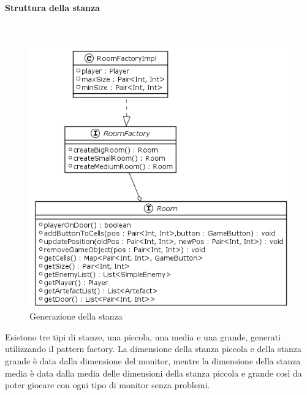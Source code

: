 \documentclass[a4paper,titlepage,12pt]{article}
\begin{document}
\paragraph{Struttura della stanza}
\par \noindent \\
\begin{figure}[H]
    \centering
    \includegraphics[scale=0.7]{img/uml/Room.png}
    \caption{Generazione della stanza}
    \label{fig: Stanza}
\end{figure}
\par \noindent Esistono tre tipi di stanze, una piccola, una media e una grande, generati utilizzando il pattern factory. La dimensione della stanza piccola e della stanza grande è data dalla dimensione del monitor, mentre la dimensione della stanza media è data dalla media delle dimensioni della stanza piccola e grande così da poter giocare con ogni tipo di monitor senza problemi.
\end{document}

